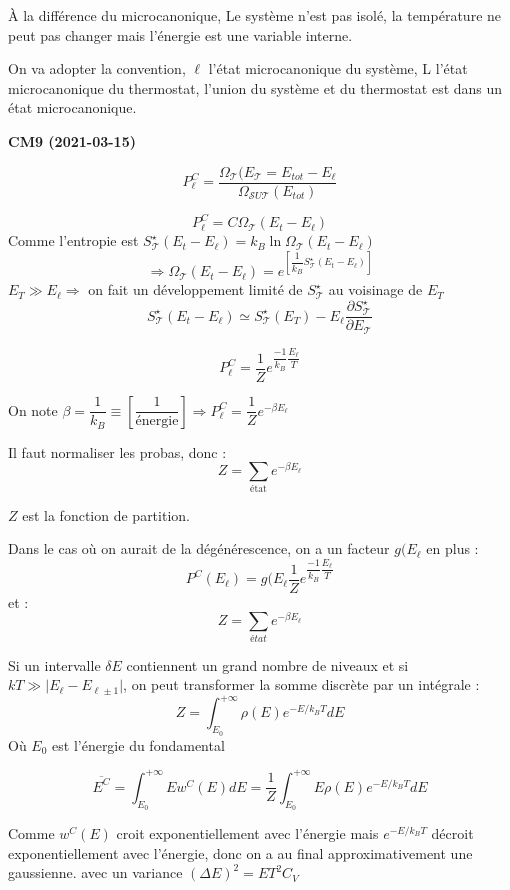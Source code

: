 \documentclass[12pt,a4paper]{report}
\begin{document}
À la différence du microcanonique, Le système n'est pas isolé, la température ne peut pas changer mais l'énergie est une variable interne.

On va adopter la convention, $\ell$ l'état microcanonique du système, L l'état microcanonique du thermostat, l'union du système et du thermostat est dans un état microcanonique.

\begin{center}
\textbf{CM9 (2021-03-15)}
\end{center}

\[
	P_\ell^C = \dfrac{\Omega_\mathcal{T} (E_\mathcal{T} = E_{tot} - E_\ell}{\Omega_{\mathcal{S} U \mathcal{T}}(E_{tot})}
\]

\[
	P_\ell^{C} = C \Omega_\mathcal{T} (E_t - E_\ell)
\]
Comme l'entropie est \(S_\mathcal{T}^\star (E_t - E_\ell) = k_B \ln \Omega_\mathcal{T} (E_t - E_\ell)\)
\[
	\Rightarrow \Omega_\mathcal{T} (E_t - E_\ell) = e^{\left[ \dfrac{1}{k_B} S_\mathcal{T}^\star (E_t - E_\ell) \right]}
\]
\(E_T \gg E_\ell \Rightarrow \) on fait un développement limité de \( S_\mathcal{T}^\star\) au voisinage de \(E_T\)
\[
	S_\mathcal{T}^\star (E_t - E_\ell) \simeq S_\mathcal{T}^\star (E_T) - E_\ell \dfrac{\partial S_\mathcal{T}^\star}{\partial E_\mathcal{T}}
\]

\[
	P_\ell^C = \dfrac{1}{Z} e^{\dfrac{-1}{k_B} \dfrac{E_\ell}{T}}
\]

On note \(\beta = \dfrac{1}{k_B} \equiv \left[ \dfrac{1}{\text{énergie}}\right] \Rightarrow P_\ell^{C} = \dfrac{1}{Z} e^{-\beta E_\ell}\)

Il faut normaliser les probas, donc :
\[
	Z = \sum_{\text{état}} e^{-\beta E_\ell}
\]

\(Z\) est la fonction de partition.

Dans le cas où on aurait de la dégénérescence, on a un facteur \(g(E_\ell\) en plus :
\[
	P^C (E_\ell) = g(E_\ell \dfrac{1}{Z} e^{\dfrac{-1}{k_B} \dfrac{E_\ell}{T}}
\]
et :
\[
	Z = \sum_{état} e^{-\beta E_\ell}
\]

Si un intervalle \(\delta E\) contiennent un grand nombre de niveaux et si \(kT \gg \vert E_\ell - E_{\ell \pm 1} \vert\), on peut transformer la somme discrète par un intégrale :
\[
	Z = \int_{E_0}^{+\infty} \rho(E) e^{-E/k_BT}dE
\]
Où \(E_0\) est l'énergie du fondamental

\[
	\overline{E^C} = \int_{E_0}^{+\infty} E w^C(E) dE = \dfrac{1}{Z} \int_{E_0}^{+\infty} E \rho(E) e^{-E/k_BT}dE
\]

Comme \(w^C(E)\) croit exponentiellement avec l'énergie mais \(e^{-E/k_BT}\) décroit exponentiellement avec l'énergie, donc on a au final approximativement une gaussienne. avec un variance \((\Delta E)^2 = ET^2 C_V\)
\end{document}
